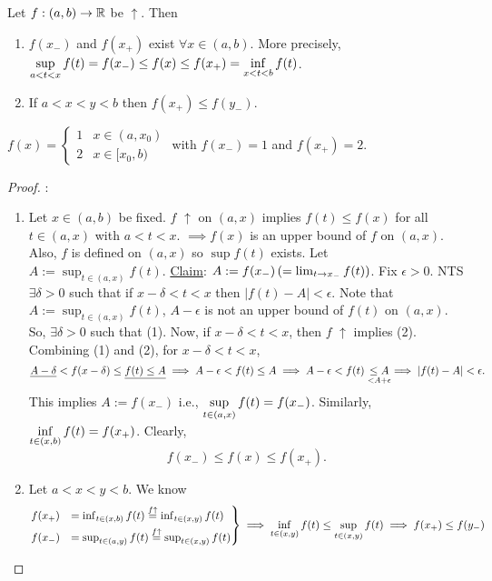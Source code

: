 \documentclass[]{article}
\begin{document}
\begin{theorem}
	Let $f:(a,b)\rightarrow\mathbb{R}$ be \ul{\ul{$\uparrow$}}. Then
	\begin{enumerate}
		\item[(i)] $f(x_-)$ and $f(x_+)$ exist $\forall x\in(a,b)$.
			More precisely, $\displaystyle\sup_{a<t<x} f(t) = f(x_-) \leq f(x) \leq f(x_+) = \inf_{x<t<b} f(t)$.
		\item[(ii)] If $a<x<y<b$ then $f(x_+) \leq f(y_-)$.
	\end{enumerate}
	\label{thm-4-29}
\end{theorem}
\begin{example}
$f(x) = \begin{cases} 1 & x\in(a,x_0) \\ 2 & x\in[x_0,b) \end{cases}$ with $f(x_-)=1$ and $f(x_+)=2$.
\end{example}
\begin{proof}:
	\begin{enumerate}
		\item[(i)] Let $x\in(a,b)$ be fixed. $f$ $\uparrow$ on $(a,x)$ implies $f(t) \leq f(x)$ for all $t\in(a,x)$ with $a<t<x$.
			$\implies f(x)$ is an upper bound of $f$ on $(a,x)$.
			Also, $f$ is defined on $(a,x)$ so $\sup f(t)$ exists.
			Let $A:=\sup_{t\in(a,x)} f(t)$.
			\ul{Claim}: $A:=f(x_-)\,(=\lim_{t\rightarrow x_-}f(t))$.
			Fix $\epsilon>0$. NTS $\exists\delta>0$ such that if $x-\delta<t<x$ then $|f(t)-A|<\epsilon$.
			Note that $A:=\sup_{t\in(a,x)}f(t)$, $A-\epsilon$ is not an upper bound of $f(t)$ on $(a,x)$.
			So, $\exists\delta>0$ such that  (1).
			Now, if $x-\delta<t<x$, then $f$ $\uparrow$ implies  (2).
			Combining (1) and (2), for $x-\delta<t<x$, 
			$$\underline{A-\delta}<f(x-\delta)\leq \underline{f(t) \leq A} \implies A-\epsilon < f(t) \leq A \implies A-\epsilon < f(t) \underset{<A+\epsilon}{\leq A} \implies |f(t)-A|<\epsilon.$$
			This implies $A:= f(x_-)$ i.e., $\displaystyle\sup_{t\in(a,x)} f(t) = f(x_-)$.
			Similarly, $\displaystyle\inf_{t\in(x,b)}f(t) = f(x_+)$.
			Clearly, $$f(x_-)\leq f(x)\leq f(x_+).$$
		\item[(ii)] Let $a<x<y<b$. We know 
			\begin{align*}
				\begin{rcases}
				f(x_+) &= \inf_{t\in(x,b)}f(t) \overset{f\uparrow}{=} \inf_{t\in(x,y)} f(t) \\
				f(x_-) &= \sup_{t\in(a,y)}f(t) \overset{f\uparrow}{=} \sup_{t\in(x,y)} f(t)
				\end{rcases}
				\implies \inf_{t\in(x,y)}f(t) \leq \sup_{t\in(x,y)}f(t) \implies f(x_+) \leq f(y_-)
			\end{align*}
	\end{enumerate}
\end{proof}
\end{document}
